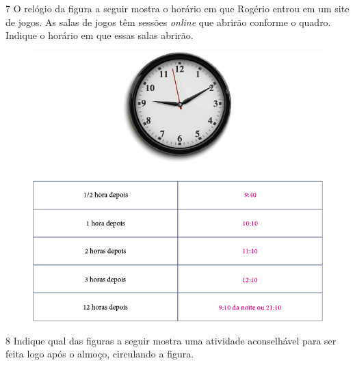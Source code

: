 
\pagebreak
\num{7} O relógio da figura a seguir mostra o horário em que Rogério entrou em um
site de jogos. As salas de jogos têm sessões \emph{online} que abrirão
conforme o quadro. Indique o horário em que essas salas abrirão.


\begin{figure}[htpb!]
\centering
\includegraphics[width=.65\textwidth]{./media/image56.png}
\end{figure}

\pagebreak

\num{8} Indique qual das figuras a seguir mostra uma atividade aconselhável para
ser feita logo após o almoço, circulando a figura.


